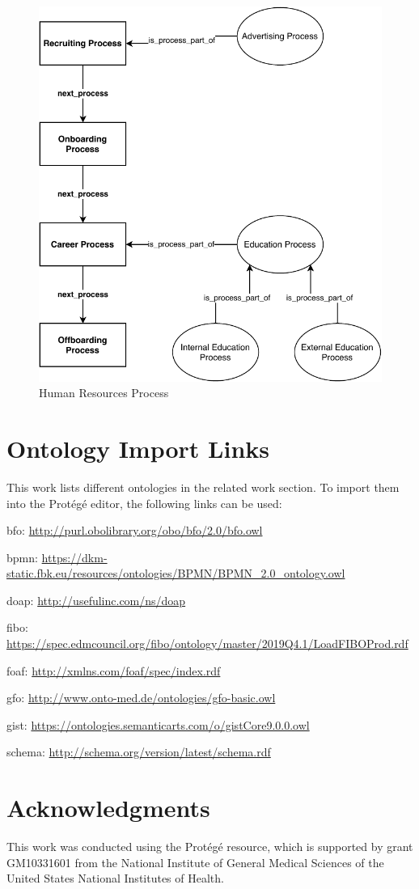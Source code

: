 \documentclass[a4paper, DIV=13, BCOR=0cm]{scrbook}
\begin{document}
\begin{figure}[h]
	\caption{Human Resources Process}
	\centering
	\includegraphics[width=1\textwidth]{Diagrams/hr-process.pdf}
\end{figure}

\clearpage
\printnoidxglossaries

\printbibliography

\newpage
\section{Ontology Import Links}
This work lists different ontologies in the related work section. To import them into the Protégé editor, the following links can be used:

\begin{asparadesc}
	\item [\gls{bfo}:] \url{http://purl.obolibrary.org/obo/bfo/2.0/bfo.owl}
	\item [\gls{bpmn}:] \url{https://dkm-static.fbk.eu/resources/ontologies/BPMN/BPMN_2.0_ontology.owl}
	\item [\gls{doap}:] \url{http://usefulinc.com/ns/doap}
	\item [\gls{fibo}:] \url{https://spec.edmcouncil.org/fibo/ontology/master/2019Q4.1/LoadFIBOProd.rdf}
	\item [\gls{foaf}:] \url{http://xmlns.com/foaf/spec/index.rdf}
	\item [\gls{gfo}:] \url{http://www.onto-med.de/ontologies/gfo-basic.owl}
	\item [\gls{gist}:] \url{https://ontologies.semanticarts.com/o/gistCore9.0.0.owl}
	\item [\gls{schema}:] \url{http://schema.org/version/latest/schema.rdf}
\end{asparadesc}

\section{Acknowledgments }
This work was conducted using the Protégé resource, which is supported by grant GM10331601 from the National Institute of General Medical Sciences of the United States National Institutes of Health.
\end{document}
